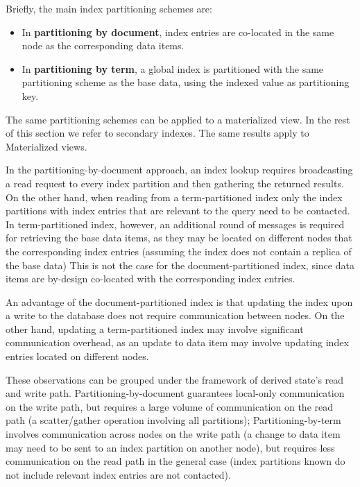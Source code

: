 Briefly, the main index partitioning schemes are:
\begin{itemize}

  \item In \textbf{partitioning by document}, index entries are co-located in the same node as the corresponding
  data items.

  \item In \textbf{partitioning by term}, a global index is partitioned with the same partitioning scheme as the base data,
  using the indexed value as partitioning key.

\end{itemize}

The same partitioning schemes can be applied to a materialized view.
In the rest of this section we refer to secondary indexes.
The same results apply to Materialized views.

In the partitioning-by-document approach, an index lookup requires broadcasting a read request to every index partition
and then gathering the returned results.
On the other hand, when reading from a term-partitioned index only the index partitions with index entries that are
relevant to the query need to be contacted.
In term-partitioned index, however, an additional round of messages is required for retrieving the base data items,
as they may be located on different nodes that the corresponding index entries (assuming the index does not contain a
replica of the base data)
This is not the case for the document-partitioned index, since data items are by-design co-located with the corresponding
index entries.

An advantage of the document-partitioned index is that updating the index upon a write to the database does not require
communication between nodes.
On the other hand, updating a term-partitioned index may involve significant communication overhead, as an update to data
item may involve updating index entries located on different nodes.

These observations can be grouped under the framework of derived state's read and write path.
Partitioning-by-document guarantees local-only communication on the write path, but requires a large volume of
communication on the read path (a scatter/gather operation involving all partitions);
Partitioning-by-term involves communication across nodes on the write path (a change to data item may need to be sent to
an index partition on another node),
but requires less communication on the read path in the general case
(index partitions known do not include relevant index entries are not contacted).

